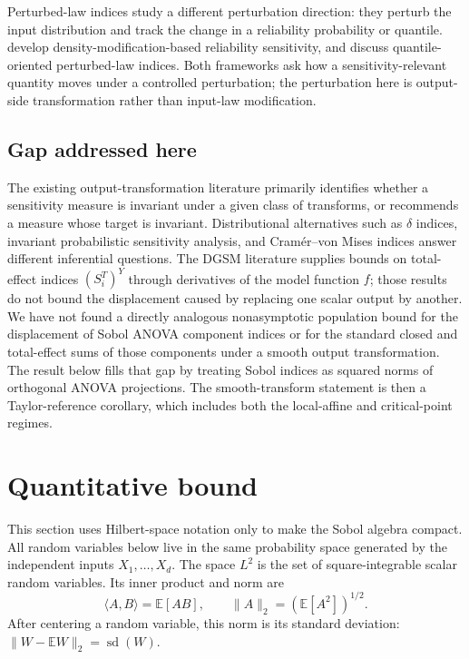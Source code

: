 \documentclass[11pt,letterpaper]{article}
\newcommand{\E}{\mathbb{E}}
\theoremstyle{remark}
\begin{document}
Perturbed-law indices study a different perturbation direction: they perturb the
input distribution and track the change in a reliability probability or quantile.
\citet{Lemaitre2015} develop density-modification-based reliability sensitivity,
and \citet{SueurIoossDelage2017} discuss quantile-oriented perturbed-law indices.
Both frameworks ask how a sensitivity-relevant quantity moves under a controlled
perturbation; the perturbation here is output-side transformation rather than
input-law modification.

\subsection{Gap addressed here}

The existing output-transformation literature primarily identifies whether a
sensitivity measure is invariant under a given class of transforms, or recommends
a measure whose target is invariant. Distributional alternatives such as
$\delta$ indices, invariant probabilistic sensitivity analysis, and
Cram\'{e}r--von Mises indices answer different inferential questions. The DGSM
literature supplies bounds on total-effect indices $(S_i^T)^Y$ through
derivatives of the model function $f$; those results do not bound the
displacement caused by replacing one scalar output by another. We have not found
a directly analogous nonasymptotic population bound for the displacement of
Sobol ANOVA component indices or for the standard closed and total-effect sums
of those components under a smooth output transformation. The result below fills
that gap by treating Sobol indices as squared norms of orthogonal ANOVA
projections. The smooth-transform statement is then a Taylor-reference
corollary, which includes both the local-affine and critical-point regimes.

\section{Quantitative bound}
\label{sec:bound}

This section uses Hilbert-space notation only to make the Sobol algebra
compact. All random variables below live in the same probability space generated
by the independent inputs $X_1,\ldots,X_d$. The space $L^2$ is the set of
square-integrable scalar random variables. Its inner product and norm are
\begin{equation}
  \langle A,B\rangle=\E[AB],
  \qquad
  \|A\|_2=(\E[A^2])^{1/2}.
\end{equation}
After centering a random variable, this norm is its standard deviation:
$\|W-\E W\|_2=\operatorname{sd}(W)$.
\end{document}
